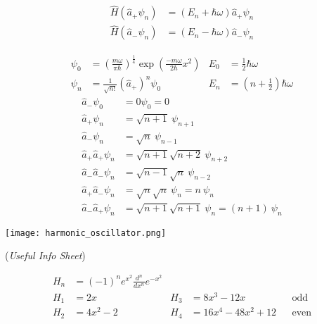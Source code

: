 \begin{align*}
    \widehat{H}(\widehat{a}_{+}\psi_n) & = (E_n+\hbar\omega)\widehat{a}_{+}\psi_n \\
    \widehat{H}(\widehat{a}_{-}\psi_n) & = (E_n-\hbar\omega)\widehat{a}_{-}\psi_n
\end{align*}

\noindent\begin{align*}
    \psi_0 & = {\left(\frac{m\omega}{\pi\hbar}\right)}^{\frac{1}{4}}\exp\left(\frac{-m\omega}{2\hbar}x^2\right) & E_0 & = \frac{1}{2}\hbar\omega     \\
    \psi_n & = \frac{1}{\sqrt{n!}}{\left(\widehat{a}_{+}\right)}^n \psi_0                                       & E_n & = (n+\frac{1}{2})\hbar\omega
\end{align*}
\begin{align*}
    \widehat{a}_{-}\psi_0                & = 0\psi_0 = 0                                      \\
    \widehat{a}_{+}\psi_n                & = \sqrt{n+1}\:\psi_{n+1}                           \\
    \widehat{a}_{-}\psi_n                & = \sqrt{n}\:\psi_{n-1}                             \\
    \widehat{a}_{+}\widehat{a}_{+}\psi_n & = \sqrt{n+1}\sqrt{n+2}\:\psi_{n+2}                 \\
    \widehat{a}_{-}\widehat{a}_{-}\psi_n & = \sqrt{n-1}\sqrt{n}\:\psi_{n-2}                   \\
    \widehat{a}_{+}\widehat{a}_{-}\psi_n & = \sqrt{n}\sqrt{n}\:\psi_{n} = n \:\psi_{n}        \\
    \widehat{a}_{-}\widehat{a}_{+}\psi_n & = \sqrt{n+1}\sqrt{n+1}\:\psi_{n} = (n+1)\:\psi_{n}
\end{align*}

\begin{center}
    \texttt{[image: harmonic\_oscillator.png]}
\end{center}

 (\textit{Useful Info Sheet})

\noindent\begin{align*}
    H_n & = {(-1)}^n e^{x^2} \frac{d^n}{dx^n} e^{-x^2}                                           \\
    H_1 & = 2x                                         & H_3 & = 8x^3-12x       &  & \text{odd}  \\
    H_2 & = 4x^2-2                                     & H_4 & = 16x^4-48x^2+12 &  & \text{even}
\end{align*}

